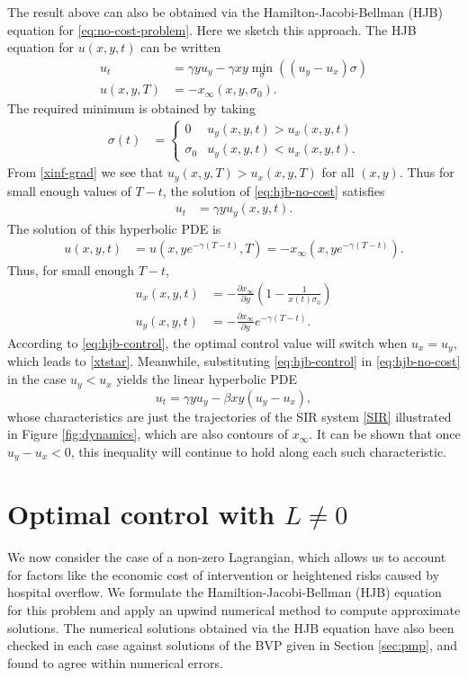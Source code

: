 \documentclass[english,12pt,letter]{article}
\newcommand{\Rnot}{\sigma_0}
\newcommand{\Sinf}{x_\infty}
\begin{document}
The result above can also be obtained via the Hamilton-Jacobi-Bellman (HJB) equation
for \eqref{eq:no-cost-problem}.  Here we sketch this approach.  The HJB
equation for $u(x,y,t)$ can be written
\begin{subequations} \label{eq:hjb-no-cost}
\begin{align}
    u_t & = \gamma y u_y - \gamma x y \min_\sigma \left((u_y-u_x)\sigma\right) \\
    u(x,y,T) & = -\Sinf(x,y,\Rnot).
\end{align}
\end{subequations}
The required minimum is obtained by taking
\begin{align} \label{eq:hjb-control}
    \sigma(t) & = \begin{cases} 
        0 & u_y(x,y,t) > u_x(x,y,t) \\
        \Rnot & u_y(x,y,t)<u_x(x,y,t).
    \end{cases}
\end{align}
From \eqref{xinf-grad} we see that $u_y(x,y,T)>u_x(x,y,T)$ for all $(x,y)$.
Thus for small enough values of $T-t$, the solution of \eqref{eq:hjb-no-cost} satisfies
\begin{align*}
    u_t & = \gamma y u_y(x,y,t).
\end{align*}
The solution of this hyperbolic PDE is
\begin{align*}
    u(x,y,t) & = u(x,ye^{-\gamma(T-t)},T) = -\Sinf(x,ye^{-\gamma(T-t)}).
\end{align*}
Thus, for small enough $T-t$,
\begin{align*}
    u_x(x,y,t) & = -\frac{\partial \Sinf}{\partial y} \left(1- \frac{1}{x(t)\Rnot}\right) \\
    u_y(x,y,t) & = -\frac{\partial \Sinf}{\partial y} e^{-\gamma(T-t)}.
\end{align*}
According to \eqref{eq:hjb-control}, the optimal control value will switch when $u_x=u_y$, which
leads to \eqref{xtstar}.  Meanwhile, substituting \eqref{eq:hjb-control} in \eqref{eq:hjb-no-cost}
in the case $u_y<u_x$ yields the linear hyperbolic PDE
$$
    u_t = \gamma y u_y - \beta x y (u_y-u_x),
$$
whose characteristics are just the trajectories of the SIR system
\eqref{SIR} illustrated in Figure \ref{fig:dynamics}, which are also
contours of $\Sinf$.  It can be shown that once $u_y-u_x<0$, this inequality
will continue to hold along each such characteristic.


\section{Optimal control with $L\ne 0$\label{sec:exploration}}
We now consider the case of a non-zero Lagrangian, which allows us to account for factors
like the economic cost of intervention or heightened risks caused by hospital
overflow.  We formulate the Hamiltion-Jacobi-Bellman (HJB) equation for this problem and
apply an upwind numerical method to compute approximate solutions.
The numerical solutions obtained via the HJB equation have also been checked in each case
against solutions of the BVP given in Section \ref{sec:pmp}, and found to
agree within numerical errors.
\end{document}
